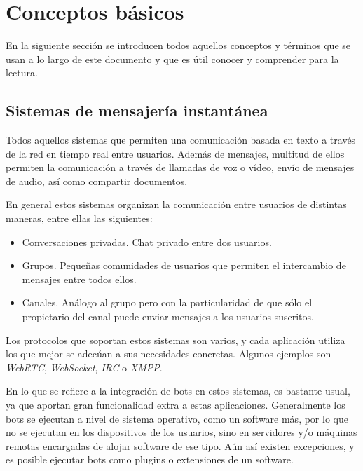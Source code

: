\section{Conceptos básicos}

En la siguiente sección se introducen todos aquellos conceptos y términos que se usan a lo largo de este documento y que es útil conocer y comprender para la lectura.



\subsection{Sistemas de mensajería instantánea}

Todos aquellos sistemas que permiten una comunicación basada en texto a través de la red en tiempo real entre usuarios. Además de mensajes, multitud de ellos permiten la comunicación a través de llamadas de voz o vídeo, envío de mensajes de audio, así como compartir documentos.

En general estos sistemas organizan la comunicación entre usuarios de distintas maneras, entre ellas las siguientes:

\begin{itemize}
	\item Conversaciones privadas. Chat privado entre dos usuarios.
	\item Grupos. Pequeñas comunidades de usuarios que permiten el intercambio de mensajes entre todos ellos.
	\item Canales. Análogo al grupo pero con la particularidad de que sólo el propietario del canal puede enviar mensajes a los usuarios suscritos.
\end{itemize}

Los protocolos que soportan estos sistemas son varios, y cada aplicación utiliza los que mejor se adecúan a sus necesidades concretas. Algunos ejemplos son \textit{WebRTC}, \textit{WebSocket}, \textit{IRC} o \textit{XMPP}.

En lo que se refiere a la integración de bots en estos sistemas, es bastante usual, ya que aportan gran funcionalidad extra a estas aplicaciones. Generalmente los bots se ejecutan a nivel de sistema operativo, como un software más, por lo que no se ejecutan en los dispositivos de los usuarios, sino en servidores y/o máquinas remotas encargadas de alojar software de ese tipo. Aún así existen excepciones, y es posible ejecutar bots como plugins o extensiones de un software.



